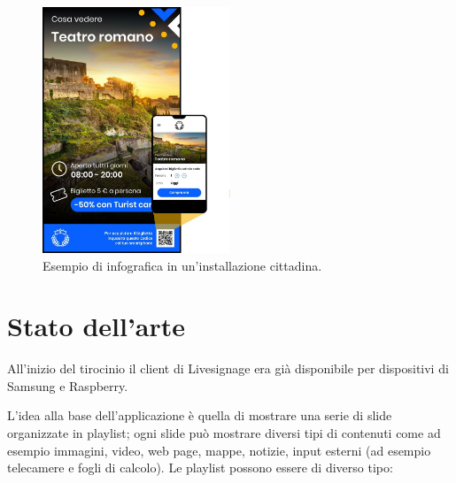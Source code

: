 \begin{figure}[!htb]
    \centering
    \includegraphics[width= 0.5\textwidth]{images/Introduzione/LiveTurist.jpg} 
    \caption{Esempio di infografica in un'installazione cittadina.} 
    \label{fig:liveToursitSample}
\end{figure}



\section{Stato dell'arte}\label{statoarte}

All'inizio del tirocinio il client di Livesignage era già disponibile per dispositivi di Samsung e Raspberry.  

L'idea alla base dell'applicazione è quella di mostrare una serie di slide organizzate in playlist; ogni slide può mostrare diversi tipi di contenuti come ad esempio immagini, video, web page, mappe, notizie, input esterni (ad esempio telecamere e fogli di calcolo). Le playlist possono essere di diverso tipo:

